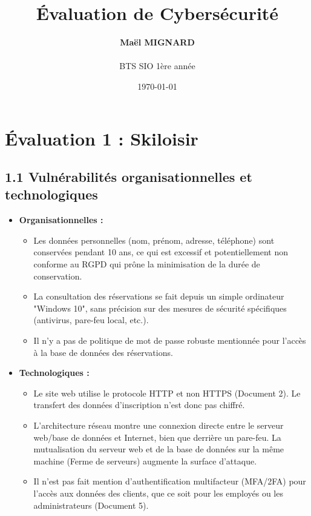 \documentclass[12pt,a4paper]{article}
\title{
    \LARGE{\textbf{Évaluation de Cybersécurité}} \\
}
\author{
    \textbf{Maël MIGNARD} \\ \\
	BTS SIO 1ère année 
}
\date{\today}
\begin{document}
\maketitle
\thispagestyle{empty}
\newpage

\section{Évaluation 1 : Skiloisir}

\subsection*{1.1 Vulnérabilités organisationnelles et technologiques}

\begin{itemize}
    	\item \textbf{Organisationnelles :} 
    	\begin{itemize}
        		\item Les données personnelles (nom, prénom, adresse, téléphone) sont conservées pendant 10 ans, ce qui est excessif et potentiellement non conforme au RGPD qui prône la minimisation de la durée de conservation.
        		\item La consultation des réservations se fait depuis un simple ordinateur "Windows 10", sans précision sur des mesures de sécurité spécifiques (antivirus, pare-feu local, etc.).
        		\item Il n'y a pas de politique de mot de passe robuste mentionnée pour l'accès à la base de données des réservations.
    		\end{itemize}
    	\item \textbf{Technologiques :} 
    	\begin{itemize}
        		\item Le site web utilise le protocole HTTP et non HTTPS (Document 2). Le transfert des données d'inscription n'est donc pas chiffré.
        		\item L'architecture réseau montre une connexion directe entre le serveur web/base de données et Internet, bien que derrière un pare-feu. La mutualisation du serveur web et de la base de données sur la même machine (Ferme de serveurs) augmente la surface d'attaque.
        		\item Il n'est pas fait mention d'authentification multifacteur (MFA/2FA) pour l'accès aux données des clients, que ce soit pour les employés ou les administrateurs (Document 5).
    		\end{itemize}
	\end{itemize}
\end{document}
